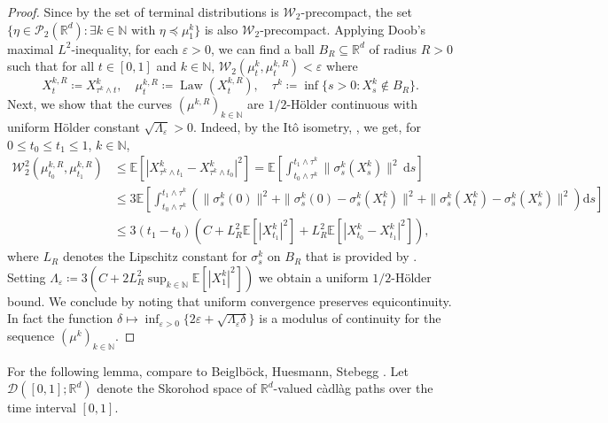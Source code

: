 \documentclass[12pt,oneside]{amsart}
\theoremstyle{definition}
\newcommand{\D}{\mathrm{d}}
\newcommand{\W}{\mathcal W}
\newcommand{\N}{\mathbb N}
\newcommand{\R}{\mathbb R}
\def\R{{\mathbb R}}
\numberwithin{equation}{section}
\begin{document}
\begin{proof}
       Since by  the set of terminal distributions is $\W_2$-precompact, the set $\{\eta \in \mathcal P_2(\R^d) \colon \exists k \in \N \mbox{ with }\eta \preceq  \mu_1^k \}$ is also $\W_2$-precompact.
       Applying Doob's maximal $L^2$-inequality, for each $\varepsilon > 0$, we can find a ball $B_R \subseteq \R^d$ of radius $R > 0$ such that for all $t \in [0,1]$ and $k \in \N$, $\W_2(\mu_t^k,\mu_t^{k,R}) < \varepsilon$ where
    \begin{equation}
        X^{k,R}_t \coloneqq X^k_{\tau^k \wedge t}, \quad \mu^{k,R}_t \coloneqq \operatorname{Law}(X^{k,R}_t), \quad
        \tau^k \coloneqq \inf \{ s > 0 \colon X^k_s \notin B_R \}.
    \end{equation}
    Next, we show that the curves $(\mu^{k,R})_{k \in \N}$ are $1/2$-H\"older continuous with uniform H\"older constant $\sqrt{\Lambda_\varepsilon} > 0$.
    Indeed, by the It\^o isometry,    , we get, for $0 \le t_0 \le t_1 \le 1$, $k \in \N$,
    \begin{align}
        \mathcal W_2^2(\mu_{t_0}^{k,R}, \mu_{t_1}^{k,R}) &\le \mathbb E \!\left[| X_{\tau^k \wedge t_1}^k - X_{\tau^k \wedge t_0}^k|^2 \right]\! = \mathbb E\!\left[ \int_{t_0 \wedge \tau^k }^{t_1 \wedge \tau^k} \|\sigma^k_s(X_s^k)\|^2 \, \D s\right]\!
        \\
        &\le 
        3 \mathbb E \!\left[ \int_{t_0 \wedge \tau^k}^{t_1 \wedge \tau^k} \!\left(\|\sigma_s^k(0)\|^2 + \|\sigma_s^k(0) - \sigma_s^k(X_t^k)\|^2 + \|\sigma_s^k(X_t^k) - \sigma_s^k(X_s^k)\|^2\right)\! \D s \right]\!
        \\
        &\le
        3 (t_1 - t_0) \!\left( C + L_R^2 \mathbb E\!\left[|X_{t_1}^k|^2\right]\! + L_R^2 \mathbb E\!\left[|X_{t_0}^k - X_{t_1}^k|^2\right]\! \right)\!,
    \end{align}
    where $L_R$ denotes the Lipschitz constant for $\sigma^k_s$ on $B_R$ that is provided by .
    Setting $\Lambda_\varepsilon \coloneqq 3( C + 2 L_R^2 \sup_{k \in \N} \mathbb E [|X_1^{k}|^2])$ we obtain a uniform $1/2$-H\"older bound. We conclude by noting that uniform convergence preserves equicontinuity.
	In fact the function $\delta \mapsto \inf_{\varepsilon > 0} \{ 2 \varepsilon + \sqrt{ \Lambda_\varepsilon \delta } \}$ is a modulus of continuity for the sequence $(\mu^k)_{k \in \N}$.
  \end{proof}

For the following lemma, compare to Beiglb\"ock, Huesmann, Stebegg \cite[Theorem 1]{BeHuSt16}. Let $\mathcal D([0, 1]; \R^d)$ denote the Skorohod space of $\R^d$-valued c\`adl\`ag paths over the time interval $[0, 1]$.
\end{document}
